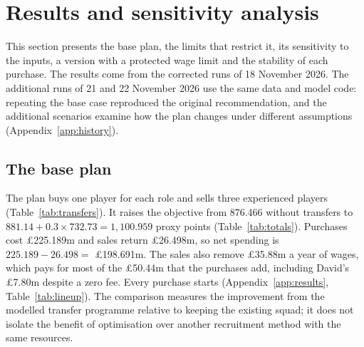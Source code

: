 \section{Results and sensitivity analysis}\label{sec:results}

This section presents the base plan, the limits that restrict it, its sensitivity to the inputs, a version with a protected wage limit and the stability of each purchase. The results come from the corrected runs of 18 November 2026. The additional runs of 21 and 22 November 2026 use the same data and model code: repeating the base case reproduced the original recommendation, and the additional scenarios examine how the plan changes under different assumptions (Appendix~\ref{app:history}).

\subsection{The base plan}

The plan buys one player for each role and sells three experienced players (Table~\ref{tab:transfers}). It raises the objective from 876.466 without transfers to $881.14 + 0.3 \times 732.73 = 1{,}100.959$ proxy points (Table~\ref{tab:totals}). Purchases cost \pounds 225.189m and sales return \pounds 26.498m, so net spending is $225.189 - 26.498 = $ \pounds 198.691m. The sales also remove \pounds 35.88m a year of wages, which pays for most of the \pounds 50.44m that the purchases add, including David's \pounds 7.80m despite a zero fee. Every purchase starts (Appendix~\ref{app:results}, Table~\ref{tab:lineup}). The comparison measures the improvement from the modelled transfer programme relative to keeping the existing squad; it does not isolate the benefit of optimisation over another recruitment method with the same resources.

\begin{table}[!htbp]
\centering
\caption{Selected transfers under the base assumptions. Quality is in the role each purchase starts in.}\label{tab:transfers}
\end{table}

\begin{table}[!htbp]
\centering
\caption{The base plan against keeping the existing squad unchanged. Money is shown as recorded in the run summary; other tables round it to two decimals.}\label{tab:totals}
\end{table}

